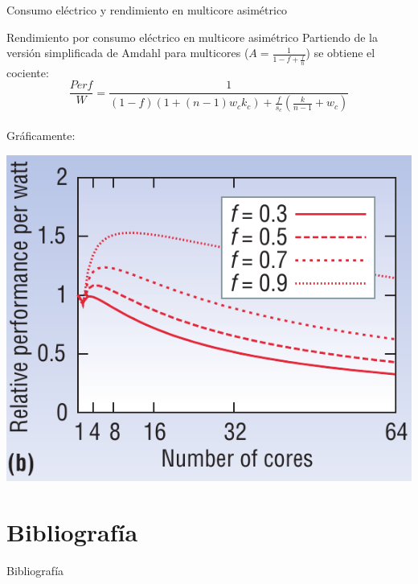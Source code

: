 \documentclass[utf8]{beamer}
\begin{document}
\begin{frame}{Consumo eléctrico y rendimiento en multicore asimétrico}
    \small
    \begin{block}{Rendimiento por consumo eléctrico en multicore asimétrico}
        Partiendo de la versión simplificada de Amdahl para multicores ($ A = \frac{1}{1 - f + \frac{f}{n}} $) se obtiene el cociente:
            $$ \frac{Perf}{W} = \frac{1}{(1-f)(1+(n-1)w_{c}k_{c}) + \frac{f}{s_{c}} (\frac{k}{n-1} + w_{c})} $$
        \\
        Gráficamente:      
    \end{block}    
    \begin{center}
        \includegraphics[width=.3\linewidth]{figures/am_powperf_c} 
    \end{center}
\end{frame}




\section{Bibliografía}

\begin{frame}[allowframebreaks]{Bibliografía}
    \nocite{*}
    
    
\end{frame}
\end{document}

